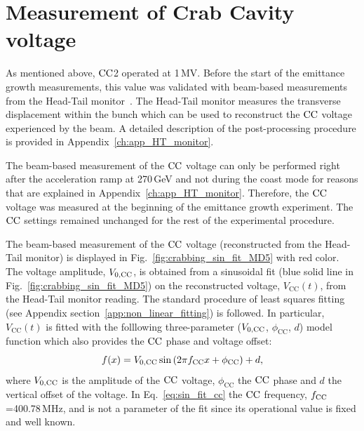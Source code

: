 \section{Measurement of Crab Cavity voltage}\label{subsec:CC_voltage_2018_measurement}
As mentioned above, ${\mathrm{CC}}$2 operated at 1\,MV. Before the start of the emittance growth measurements, this value was validated with beam-based measurements from the Head-Tail monitor~\cite{sps_headtail_monitor}. The Head-Tail monitor measures the transverse displacement within the bunch which can be used to reconstruct the ${\mathrm{CC}}$ voltage experienced by the beam. A detailed description of the post-processing procedure is provided in Appendix~\ref{ch:app_HT_monitor}.

The beam-based measurement of the ${\mathrm{CC}}$ voltage can only be performed right after the acceleration ramp at 270\,GeV and not during the coast mode for reasons that are explained in Appendix~\ref{ch:app_HT_monitor}. Therefore, the ${\mathrm{CC}}$ voltage was measured at the beginning of the emittance growth experiment.%
The ${\mathrm{CC}}$ settings remained unchanged for the rest of the experimental procedure.

The beam-based measurement of the ${\mathrm{CC}}$ voltage (reconstructed from the Head-Tail monitor) is displayed in Fig.~\ref{fig:crabbing_sin_fit_MD5} with red color. The voltage amplitude, ${V_\mathrm{0, CC}}$, is obtained from a sinusoidal fit (blue solid line in Fig.~\ref{fig:crabbing_sin_fit_MD5}) on the reconstructed voltage, $V_\mathrm{CC}(t)$, from the Head-Tail monitor reading. The standard procedure of least squares fitting (see Appendix section~\ref{app:non_linear_fitting}) is followed. In particular, $V_\mathrm{CC}(t)$ is fitted with the folllowing three-parameter (${V_\mathrm{0, CC}}$, $\phi_\mathrm{CC}$, $d$) model function which also provides the ${\mathrm{CC}}$ phase and voltage offset:
\begin{equation}\label{eq:sin_fit_cc}
   f(x) = {V_\mathrm{0, CC}} \sin{(2\pi {f_\mathrm{CC}}x + \phi_\mathrm{CC})} + d ,
\end{equation}
where ${V_\mathrm{0, CC}}$ is the amplitude of the ${\mathrm{CC}}$ voltage, $ \phi_\mathrm{CC}$ the ${\mathrm{CC}}$ phase and $d$ the vertical offset of the voltage. In Eq.~\eqref{eq:sin_fit_cc} the ${\mathrm{CC}}$ frequency, ${f_\mathrm{CC}}$=400.78\,MHz, and is not a parameter of the fit since its operational value is fixed and well known.


